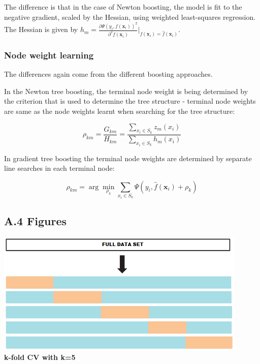 \documentclass[12pt,]{article}
\begin{document}
The difference is that in the case of Newton boosting, the model is fit
to the negative gradient, scaled by the Hessian, using weighted
least-squares regression. The Hessian is given by
\(h_m = \frac{\partial{\Psi(y_{i},f(\mathbf{x}_i))}^{2}}{\partial^{2}{f(\mathbf{x}_i)}}\rvert_{f(\mathbf{x}_i)=\widehat{f}(\mathbf{x}_i)}\).

\hypertarget{node-weight-learning}{%
\subsubsection{Node weight learning}\label{node-weight-learning}}

The differences again come from the different boosting approaches.

In the Newton tree boosting, the terminal node weight is being
determined by the criterion that is used to determine the tree structure
- terminal node weights are same as the node weights learnt when
searching for the tree structure:

\[\rho_{km}=\frac{G_{km}}{H_{km}}=\frac{\sum_{x_i\in S_k}z_m(x_i)}{\sum_{x_i\in S_k}h_m(x_i)}\]

In gradient tree boosting the terminal node weights are determined by
separate line searches in each terminal node:

\[\rho_{km} = \arg\min_{\rho_k}\sum_{x_i\in S_k}\Psi(y_i,\widehat{f}(\mathbf{x}_{i})+\rho_k)\]

\clearpage

\hypertarget{a.4-figures}{%
\subsection{A.4 Figures}\label{a.4-figures}}

\center

\includegraphics[width=0.9\textwidth,height=\textheight]{figures/crossval.png}\\
\textbf{k-fold CV with k=5}
\end{document}
